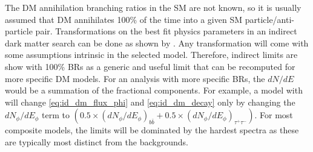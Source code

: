 \begin{figure}[h]
\end{figure}

The DM annihilation branching ratios in the SM are not known, so it is usually assumed that DM annihilates 100\% of the time into a given SM particle/anti-particle pair.
Transformations on the best fit physics parameters in an indirect dark matter search can be done as shown by \cite{directdetect:transform,les_houches:harris}.
Any transformation will come with some assumptions intrinsic in the selected model.
Therefore, indirect limits are show with 100\% BRs as a generic and useful limit that can be recomputed for more specific DM models.
For an analysis with more specific BRs, the $dN/dE$ would be a summation of the fractional components.
For example, a model with
\BRexample
will change \cref{eq:id_dm_flux_phi} and \cref{eq:id_dm_decay} only by changing the $dN_\phi / dE_\phi$ term to $( 0.5 \times (dN_\phi/dE_\phi)_{b\bar{b}} + 0.5 \times (dN_\phi/dE_\phi)_{\tau^+\tau^-})$.
For most composite models, the limits will be dominated by the hardest spectra as these are typically most distinct from the backgrounds. 

